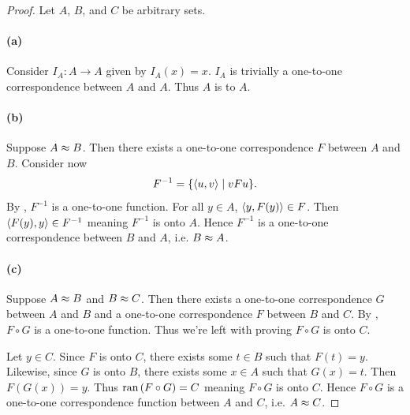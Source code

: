 \documentclass{report}
\begin{document}
  \begin{proof}

    Let $A$, $B$, and $C$ be arbitrary sets.

    \paragraph{(a)}%

      Consider  $I_A \colon A \rightarrow A$ given by
        $I_A(x) = x$.
      $I_A$ is trivially a one-to-one correspondence between $A$ and $A$.
      Thus $A$ is  to $A$.

    \paragraph{(b)}%

      Suppose $A \approx B$.
      Then there exists a one-to-one correspondence $F$ between $A$ and $B$.
      Consider now  $$F^{-1} = \{\left< u, v \right> \mid vFu\}.$$
      By , $F^{-1}$ is a one-to-one function.
      For all $y \in A$, $\left< y, F(y) \right> \in F$.
      Then $\left< F(y), y \right> \in F^{-1}$ meaning $F^{-1}$ is onto $A$.
      Hence $F^{-1}$ is a one-to-one correspondence between $B$ and $A$, i.e.
        $B \approx A$.

    \paragraph{(c)}%

      Suppose $A \approx B$ and $B \approx C$.
      Then there exists a one-to-one correspondence $G$ between $A$ and $B$ and
        a one-to-one correspondence $F$ between $B$ and $C$.
      By , $F \circ G$ is a one-to-one
        function.
      Thus we're left with proving $F \circ G$ is onto $C$.

      Let $y \in C$.
      Since $F$ is onto $C$, there exists some $t \in B$ such that $F(t) = y$.
      Likewise, since $G$ is onto $B$, there exists some $x \in A$ such that
        $G(x) = t$.
      Then $F(G(x)) = y$.
      Thus $\mathop{\text{ran}}{(F \circ G)} = C$ meaning $F \circ G$ is onto $C$.
      Hence $F \circ G$ is a one-to-one correspondence function between $A$ and
        $C$, i.e. $A \approx C$.

  \end{proof}
\end{document}
